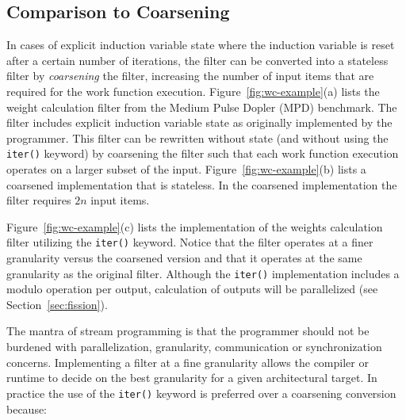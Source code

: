 \subsection{Comparison to Coarsening}
\label{sec:coarsen}






In cases of explicit induction variable state where the induction
variable is reset after a certain number of iterations, the filter can
be converted into a stateless filter by {\it coarsening} the filter,
increasing the number of input items that are required for the work
function execution.  Figure~\ref{fig:wc-example}(a) lists the weight
calculation filter from the Medium Pulse Dopler (MPD) benchmark.  The
filter includes explicit induction variable state as originally
implemented by the programmer.  This filter can be rewritten without
state (and without using the {\tt iter()} keyword) by coarsening the
filter such that each work function execution operates on a larger
subset of the input.  Figure~\ref{fig:wc-example}(b) lists a coarsened
implementation that is stateless.  In the coarsened implementation the
filter requires $2n$ input items.

Figure~\ref{fig:wc-example}(c) lists the implementation of the weights
calculation filter utilizing the {\tt iter()} keyword.  Notice that
the filter operates at a finer granularity versus the coarsened
version and that it operates at the same granularity as the original
filter.  Although the {\tt iter()} implementation includes a modulo
operation per output, calculation of outputs will be parallelized
(see Section~\ref{sec:fission}).

The mantra of stream programming is that the programmer should not be
burdened with parallelization, granularity, communication or
synchronization concerns.  Implementing a filter at a fine granularity
allows the compiler or runtime to decide on the best granularity for a
given architectural target.  In practice the use of the {\tt iter()}
keyword is preferred over a coarsening conversion because:

